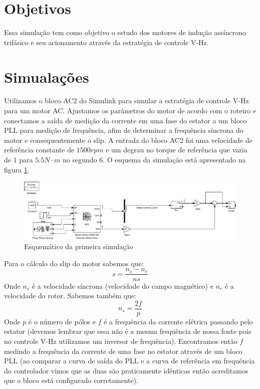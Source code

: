 \documentclass{article}
\begin{document}


\onehalfspacing
\section{Objetivos}
	Essa simulação tem como objetivo o estudo dos motores de indução assíncrono trifásico e seu acionamento através da estratégia de controle V-Hz.
	 
\section{Simualações}
Utilizamos o bloco AC2 do Simulink para simular a estratégia de controle V-Hz para um motor AC. Ajustamos os parâmetros do motor de acordo com o roteiro e conectamos a saída de medição da corrente em uma fase do estator a um bloco PLL para medição de frequência, afim de determinar a frequência síncrona do motor e consequentemente o slip. A entrada do bloco AC2 foi uma velocidade de referência constante de $1500 rpm$ e um degrau no torque de referência que varia de $1$ para $5.5 N\cdot m$ no segundo 6. O esquema da simulação está apresentado na figura \ref{fig:sim1}.
\begin{figure}[H]
	\centering
	\includegraphics[width=\linewidth]{matlab/sim1}
	\caption{Esquemático da primeira simulação}
	\label{fig:sim1}
\end{figure}

Para o cálculo do slip do motor sabemos que:
\begin{equation}
	s = \frac{n_s - n_r}{ns}
\end{equation}
Onde $n_s$ é a velocidade síncrona (velocidade do campo magnético) e $n_r$ é a velocidade do rotor.
Sabemos também que:
\begin{equation}
	n_s = \frac{2f}{p}
\end{equation}
Onde $p$ é o número de pólos e $f$ é a frequência da corrente elétrica passando pelo estator (devemos lembrar que essa não é a mesma frequência de nossa fonte pois no controle V-Hz utilizamos um inversor de frequência). Encontramos então $f$ medindo a frequência da corrente de uma fase no estator através de um bloco PLL (ao comparar a curva de saída do PLL e a curva de referência em frequência do controlador vimos que as duas são praticamente idênticas então acreditamos que o bloco está configurado corretamente).
\end{document}
